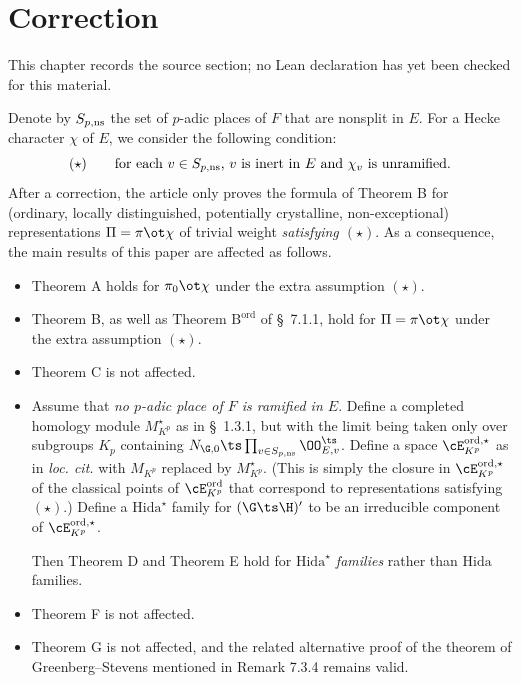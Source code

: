 \chapter{Correction}
\label{universal-p-adic-gross-zagier-formula-chapter-09}

\begin{remark}
\label{universal-p-adic-gross-zagier-formula-chapter-09-source}
This chapter records the source section; no Lean declaration has yet been checked for this material.
\notready
\end{remark}

Denote by $S_{p, \rm ns}$ the set of $p$-adic places of $F$ that are nonsplit in $E$.
 For a Hecke character $\chi$ of $E$, we consider the following condition:
$$(\star) \qquad  \text{for each  $v\in S_{p, \rm ns}$,  $v$ is inert in $E$ and $\chi_{v}$ is unramified}.$$
After a correction, the  article \cite{nonsplit} only proves the formula of Theorem B for  (ordinary, locally distinguished, potentially crystalline, non-exceptional) representations $\Pi=\pi\ot\chi$ of trivial weight  \emph{satisfying $(\star)$}. As a consequence, the main results of this paper are affected as follows.
\begin{itemize}
\item Theorem A  holds for $\pi_{0} \ot \chi$ under the extra assumption $(\star)$.
\item Theorem B, as well as Theorem $\text{B}^{\text{ord}}$ of \S~7.1.1, hold for   $\Pi=\pi \ot \chi$ under the extra assumption $(\star)$.
\item Theorem C is not affected.
\item Assume that \emph{no $p$-adic place of $F$ is ramified in $E$}. Define a completed homology module $M_{K^{p}}^{\star}$  as in \S~1.3.1, but with the limit being taken only over subgroups $K_{p}$ containing $N_{\G , 0} \ts \prod_{v \in S_{p, \rm ns}} \OO_{E,v}^{\ts}$. Define a space $\cE_{K^{p}}^{\rm ord, \star}$ as in \emph{loc. cit.} with $M_{K^{p}}$ replaced by $M_{K^{p}}^{\star}$. (This is simply the closure in $\cE^{\rm ord, \star}_{K^{p}}$ of the classical points of $\cE^{\rm ord}_{K^{p}}$ that correspond to representations satisfying $(\star)$.)  Define a $\text{Hida}^{\star}$ family for $(\G\ts \H)'$ to be an irreducible component of $\cE_{K^{p}}^{\rm ord, \star}$.

Then Theorem D and Theorem E hold for \emph{$\text{Hida}^{\star}$ families} rather than $\text{Hida}$ families.
\item Theorem F is not affected.
\item Theorem G is not affected, and the related alternative proof of the theorem of Greenberg--Stevens mentioned in Remark 7.3.4 remains valid.
\end{itemize}

